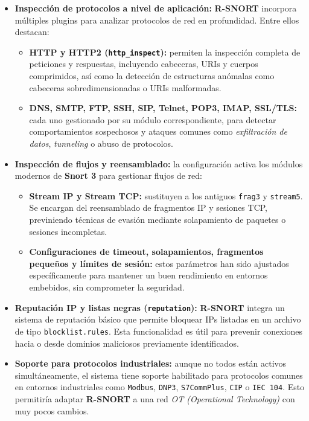 \documentclass[12pt,a4paper]{report}
\begin{document}
\begin{itemize}
	\item \textbf{Inspección de protocolos a nivel de aplicación:}  
	\textbf{R-SNORT} incorpora múltiples plugins para analizar protocolos de red en profundidad. Entre ellos destacan:
	\begin{itemize}
		\item \textbf{HTTP y HTTP2 (\texttt{http\_inspect}):} permiten la inspección completa de peticiones y respuestas, incluyendo cabeceras, URIs y cuerpos comprimidos, así como la detección de estructuras anómalas como cabeceras sobredimensionadas o URIs malformadas.
		\item \textbf{DNS, SMTP, FTP, SSH, SIP, Telnet, POP3, IMAP, SSL/TLS:} cada uno gestionado por su módulo correspondiente, para detectar comportamientos sospechosos y ataques comunes como \textit{exfiltración de datos}, \textit{tunneling} o abuso de protocolos.
	\end{itemize}
	
	\item \textbf{Inspección de flujos y reensamblado:}  
	la configuración activa los módulos modernos de \textbf{Snort 3} para gestionar flujos de red:
	\begin{itemize}
		\item \textbf{Stream IP y Stream TCP:} sustituyen a los antiguos \texttt{frag3} y \texttt{stream5}. Se encargan del reensamblado de fragmentos IP y sesiones TCP, previniendo técnicas de evasión mediante solapamiento de paquetes o sesiones incompletas.
		\item \textbf{Configuraciones de timeout, solapamientos, fragmentos pequeños y límites de sesión:} estos parámetros han sido ajustados específicamente para mantener un buen rendimiento en entornos embebidos, sin comprometer la seguridad.
	\end{itemize}
	
	\item \textbf{Reputación IP y listas negras (\texttt{reputation}):}  
	\textbf{R-SNORT} integra un sistema de reputación básico que permite bloquear IPs listadas en un archivo de tipo \texttt{blocklist.rules}. Esta funcionalidad es útil para prevenir conexiones hacia o desde dominios maliciosos previamente identificados.
	
	\item \textbf{Soporte para protocolos industriales:}  
	aunque no todos están activos simultáneamente, el sistema tiene soporte habilitado para protocolos comunes en entornos industriales como \texttt{Modbus}, \texttt{DNP3}, \texttt{S7CommPlus}, \texttt{CIP} o \texttt{IEC 104}. Esto permitiría adaptar \textbf{R-SNORT} a una red \textit{OT (Operational Technology)} con muy pocos cambios.
	

\end{itemize}
\end{document}
